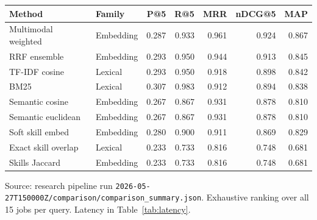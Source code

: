 \caption{Retrieval method comparison (macro-averaged, $K{=}5$).}
\label{tab:method-comparison}
\begin{tabular}{@{}llrrrrr@{}}
\toprule
Method & Family & P@5 & R@5 & MRR & nDCG@5 & MAP \\
\midrule
Multimodal weighted & Embedding & 0.287 & 0.933 & 0.961 & 0.924 & 0.867 \\
RRF ensemble & Embedding & 0.293 & 0.950 & 0.944 & 0.913 & 0.845 \\
TF-IDF cosine & Lexical & 0.293 & 0.950 & 0.918 & 0.898 & 0.842 \\
BM25 & Lexical & 0.307 & 0.983 & 0.912 & 0.894 & 0.838 \\
Semantic cosine & Embedding & 0.267 & 0.867 & 0.931 & 0.878 & 0.810 \\
Semantic euclidean & Embedding & 0.267 & 0.867 & 0.931 & 0.878 & 0.810 \\
Soft skill embed & Embedding & 0.280 & 0.900 & 0.911 & 0.869 & 0.829 \\
Exact skill overlap & Lexical & 0.233 & 0.733 & 0.816 & 0.748 & 0.681 \\
Skills Jaccard & Embedding & 0.233 & 0.733 & 0.816 & 0.748 & 0.681 \\
\bottomrule
\end{tabular}
\par\vspace{0.4em}
\footnotesize{Source: research pipeline run \texttt{2026-05-27T150000Z/comparison/comparison\_summary.json}. Exhaustive ranking over all 15 jobs per query. Latency in Table~\ref{tab:latency}.}
